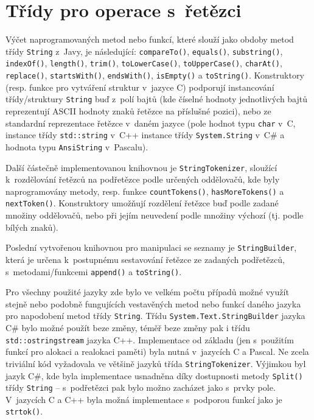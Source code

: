 \documentclass[czech,BP]{thesiskiv}
\begin{document}
\section{Třídy pro operace s~řetězci}
Výčet naprogramovaných metod nebo funkcí, které slouží jako obdoby metod třídy \texttt{String} z~Javy, je následující: \texttt{compareTo()}, \texttt{equals()}, \texttt{substring()}, \texttt{indexOf()}, \texttt{length()}, \texttt{trim()}, \texttt{toLowerCase()}, \texttt{toUpperCase()}, \texttt{charAt()}, \texttt{replace()}, \texttt{startsWith()}, \texttt{endsWith()}, \texttt{isEmpty()} a \texttt{toString()}. Konstruktory (resp. funkce pro vytváření struktur v~jazyce C) podporují instancování třídy/struktury \texttt{String} buď z~polí bajtů (kde číselné hodnoty jednotlivých bajtů reprezentují ASCII hodnoty znaků řetězce na příslušné pozici), nebo ze standardní reprezentace řetězce v~daném jazyce (pole hodnot typu \texttt{char} v~C, instance třídy \texttt{std::string} v~C++ instance třídy \texttt{System.String} v~C\# a hodnota typu \texttt{AnsiString} v~Pascalu).\par
Další částečně implementovanou knihovnou je \texttt{StringTokenizer}, sloužící k~rozdělování řetězců na podřetězce podle určených oddělovačů, kde byly naprogramovány metody, resp. funkce \texttt{countTokens()}, \texttt{hasMoreTokens()} a \texttt{nextToken()}. Konstruktory umožňují rozdělení řetězce buď podle zadané množiny oddělovačů, nebo při jejím neuvedení podle množiny výchozí (tj. podle bílých znaků).\par
Poslední vytvořenou knihovnou pro manipulaci se seznamy je \texttt{String\-Builder}, která je určena k~postupnému sestavování řetězce ze zadaných podřetězců, s~metodami/funkcemi \texttt{append()} a \texttt{toString()}.\par
Pro všechny použité jazyky zde bylo ve velkém počtu případů možné využít stejně nebo podobně fungujících vestavěných metod nebo funkcí daného jazyka pro napodobení metod třídy \texttt{String}. Třídu \texttt{System.Text.String\-Builder} jazyka C\# bylo možné použít beze změny, téměř beze změny pak i třídu \texttt{std::ostringstream} jazyka C++. Implementace od základu (jen s~použitím funkcí pro alokaci a realokaci paměti) byla nutná v~jazycích C a Pascal. Ne zcela triviální kód vyžadovala ve většině jazyků třída \texttt{String\-Tokenizer}. Výjimkou byl jazyk C\#, kde byla implementace usnadněna díky dostupnosti metody \texttt{Split()} třídy \texttt{String} -- s~podřetězci pak bylo možno zacházet jako s~prvky pole. V~jazycích C a C++ byla možná implementace s~podporou funkcí jako je \texttt{strtok()}.
\end{document}
